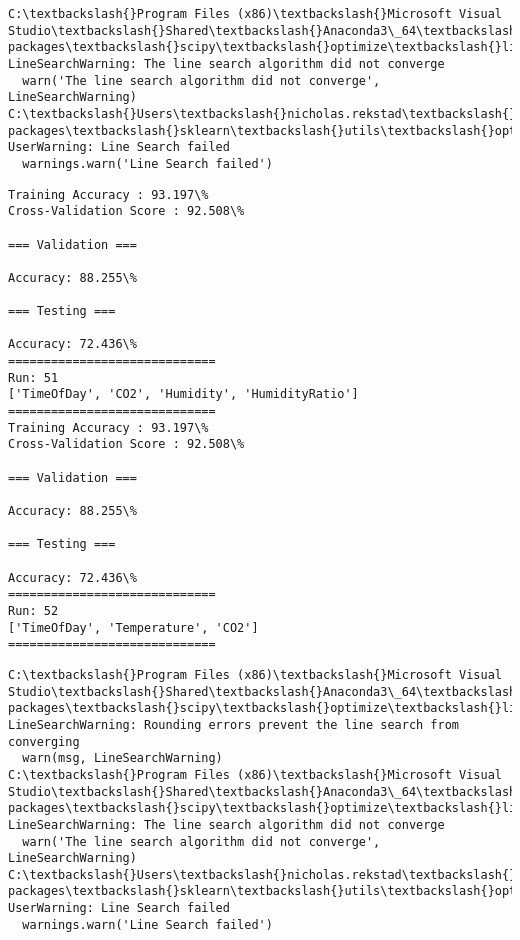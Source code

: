 \documentclass[11pt]{article}
\begin{document}
    \begin{Verbatim}[commandchars=\\\{\}]
C:\textbackslash{}Program Files (x86)\textbackslash{}Microsoft Visual Studio\textbackslash{}Shared\textbackslash{}Anaconda3\_64\textbackslash{}lib\textbackslash{}site-packages\textbackslash{}scipy\textbackslash{}optimize\textbackslash{}linesearch.py:313: LineSearchWarning: The line search algorithm did not converge
  warn('The line search algorithm did not converge', LineSearchWarning)
C:\textbackslash{}Users\textbackslash{}nicholas.rekstad\textbackslash{}AppData\textbackslash{}Roaming\textbackslash{}Python\textbackslash{}Python36\textbackslash{}site-packages\textbackslash{}sklearn\textbackslash{}utils\textbackslash{}optimize.py:195: UserWarning: Line Search failed
  warnings.warn('Line Search failed')

    \end{Verbatim}

    \begin{Verbatim}[commandchars=\\\{\}]
Training Accuracy : 93.197\%
Cross-Validation Score : 92.508\%

=== Validation ===

Accuracy: 88.255\%

=== Testing ===

Accuracy: 72.436\%
=============================
Run: 51
['TimeOfDay', 'CO2', 'Humidity', 'HumidityRatio']
=============================
Training Accuracy : 93.197\%
Cross-Validation Score : 92.508\%

=== Validation ===

Accuracy: 88.255\%

=== Testing ===

Accuracy: 72.436\%
=============================
Run: 52
['TimeOfDay', 'Temperature', 'CO2']
=============================

    \end{Verbatim}

    \begin{Verbatim}[commandchars=\\\{\}]
C:\textbackslash{}Program Files (x86)\textbackslash{}Microsoft Visual Studio\textbackslash{}Shared\textbackslash{}Anaconda3\_64\textbackslash{}lib\textbackslash{}site-packages\textbackslash{}scipy\textbackslash{}optimize\textbackslash{}linesearch.py:422: LineSearchWarning: Rounding errors prevent the line search from converging
  warn(msg, LineSearchWarning)
C:\textbackslash{}Program Files (x86)\textbackslash{}Microsoft Visual Studio\textbackslash{}Shared\textbackslash{}Anaconda3\_64\textbackslash{}lib\textbackslash{}site-packages\textbackslash{}scipy\textbackslash{}optimize\textbackslash{}linesearch.py:313: LineSearchWarning: The line search algorithm did not converge
  warn('The line search algorithm did not converge', LineSearchWarning)
C:\textbackslash{}Users\textbackslash{}nicholas.rekstad\textbackslash{}AppData\textbackslash{}Roaming\textbackslash{}Python\textbackslash{}Python36\textbackslash{}site-packages\textbackslash{}sklearn\textbackslash{}utils\textbackslash{}optimize.py:195: UserWarning: Line Search failed
  warnings.warn('Line Search failed')

    \end{Verbatim}
\end{document}
